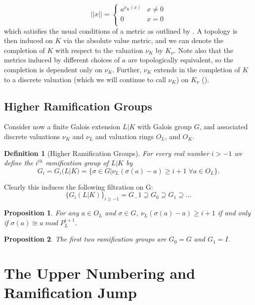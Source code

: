 \documentclass[paper=a4, fontsize=11pt]{scrartcl} %
\numberwithin{equation}{section} %
\numberwithin{figure}{section} %
\numberwithin{table}{section} %
\theoremstyle{break}
\newtheorem{defn}{Definition}
\newtheorem{prop}{Proposition}
\begin{document}
\[ ||x|| =  \begin{cases} 
      a^{\nu_K(x)} & x \not= 0 \\
      0 & x = 0 \\
   \end{cases}
\]
which satisfies the usual conditions of a metric as outlined by \cite{Serre}. A topology is then induced on $K$ via the absolute value metric, and we can denote the completion of $K$ with respect to the valuation $\nu_K$ by $K_\nu$. Note also that the metrics induced by different choices of $a$ are topologically equivalent, so the completion is dependent only on $\nu_K$. Further, $\nu_K$ extends in the completion of $K$ to a discrete valuation (which we will continue to call $\nu_K$) on $K_\nu$ (\cite{Serre}).

\subsection{Higher Ramification Groups}
Consider now a finite Galois extension $L|K$ with Galois group $G$, and associated discrete valuations $\nu_K$ and $\nu_L$ and valuation rings $O_L$, and $O_K$.
\begin{defn}[Higher Ramification Groups]
For every real number $i > -1$ we define the $i^{th}$ ramification group of $L|K$ by
$$
G_i = G_i(L|K) = \{\sigma \in G | \nu_L(\sigma(a)-a)\geq i+1 \;\forall a \in O_L\}.
$$
\end{defn}

Clearly this induces the following filtration on G:
$$
\{G_i(L|K)\}_{i\geq -1} = G_-1 \supseteq G_0 \supseteq G_1 \supseteq \ldots
$$

\begin{prop}
For any $a \in O_L$ and $\sigma \in G$, $\nu_L(\sigma(a) - a) \geq i+1$ if and only if  $\sigma(a) \cong a \; mod \; P_L^{i+1}$.
\end{prop}


\begin{prop}
The first two ramification groups are $G_{0} = G$ and $G_{1}=I$.
\end{prop}

\section{The Upper Numbering and Ramification Jump}
\end{document}
